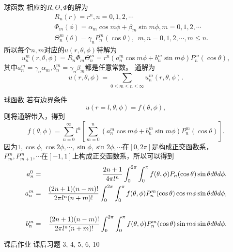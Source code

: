 \documentclass[11pt]{beamer}
\newcommand{\kong}[1][0.5]{\vspace{#1cm}}
\begin{document}
\begin{frame}{球函数}
相应的$R, \Theta, \Phi$的解为
\begin{eqnarray}
&& R_n (r) = r^n, n=0,1,2,\cdots \\
&& \Phi_m (\phi) = \alpha_m \cos m \phi + \beta_m \sin m \phi, m = 0,1,2,\cdots \\
&& \Theta^m_n(\theta) = \gamma_n P^m_n (\cos \theta), ~~ m,n = 0,1,2,\cdots, m\leq n.
\end{eqnarray}
所以每个$n,m$对应的$u(r,\theta,\phi)$特解为
\begin{equation}
u^m_n(r,\theta, \phi) = R_n \Phi_m \Theta^m_n = r^n( a^m_n \cos m\phi + b^m_n \sin m \phi) P^m_n(\cos \theta),
\end{equation}
其中$a^m_n = \gamma_n \alpha_m, b^m_n = \gamma_n \beta_m$都是任意常数。
通解为
\begin{equation}
u(r,\theta, \phi) = \sum_{0\leq m \leq n \leq \infty} u^m_n(r, \theta, \phi).
\end{equation}
\end{frame}

\begin{frame}{球函数}
若有边界条件
\begin{equation}
u(r=l, \theta, \phi) = f(\theta, \phi),
\end{equation}
则将通解带入，得到
\begin{equation}
f(\theta, \phi) = \sum^\infty_{n=0} l^n [ \sum^n_{m=0} (a^m_n \cos m\phi + b^m_n \sin m \phi) P^m_n(\cos \theta) ].
\end{equation}
因为${1,\cos\phi, \cos 2 \phi, \cdots, \sin \phi, \sin 2 \phi, \cdots}$在$[0,2\pi]$是构成正交函数系，$P^m_m, P^m_{m+1}, \cdots$在$[-1,1]$上构成正交函数系，所以可以得到
\begin{eqnarray}
\footnotesize
a^0_n &=& \frac{2n+1}{4\pi l^n} \int^{2\pi}_0 \int^\pi_0 f(\theta, \phi) P_n(\cos \theta) \sin \theta d\theta d \phi, \\
a^m_n &=& \frac{(2n+1)(n-m)!}{2\pi l^n (n+m)!} \int^{2\pi}_0 \int^\pi_0 f(\theta, \phi) P^m_n(\cos \theta) \cos m\phi \sin \theta d\theta d \phi, \nonumber
\\
\\
b^m_n &=& \frac{(2n+1)(n-m)!}{2\pi l^n (n+m)!} \int^{2\pi}_0 \int^\pi_0 f(\theta, \phi) P^m_n(\cos \theta) \sin m\phi \sin \theta d\theta d \phi. 
\nonumber\\
\end{eqnarray}
\end{frame}

\begin{frame}{课后作业}
\kong[1]
课后习题 3, 4, 5, 6, 10
\end{frame}
\end{document}
